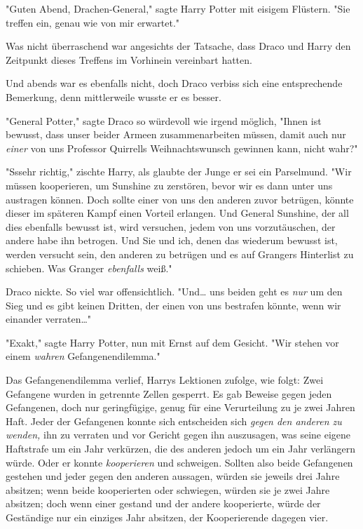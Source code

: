 {"Guten Abend, Drachen-General," sagte Harry Potter mit eisigem Flüstern. "Sie treffen ein, genau wie von mir erwartet."

Was nicht überraschend war angesichts der Tatsache, dass Draco und Harry den Zeitpunkt dieses Treffens im Vorhinein vereinbart hatten.

Und abends war es ebenfalls nicht, doch Draco verbiss sich eine entsprechende Bemerkung, denn mittlerweile wusste er es besser.

"General Potter," sagte Draco so würdevoll wie irgend möglich, "Ihnen ist bewusst, dass unser beider Armeen zusammenarbeiten müssen, damit auch nur \emph{einer} von uns Professor Quirrells Weihnachtswunsch gewinnen kann, nicht wahr?"

"Sssehr richtig," zischte Harry, als glaubte der Junge er sei ein Parselmund. "Wir müssen kooperieren, um Sunshine zu zerstören, bevor wir es dann unter uns austragen können. Doch sollte einer von uns den anderen zuvor betrügen, könnte dieser im späteren Kampf einen Vorteil erlangen. Und General Sunshine, der all dies ebenfalls bewusst ist, wird versuchen, jedem von uns vorzutäuschen, der andere habe ihn betrogen. Und Sie und ich, denen das wiederum bewusst ist, werden versucht sein, den anderen zu betrügen und es auf Grangers Hinterlist zu schieben. Was Granger \emph{ebenfalls} weiß."

Draco nickte. So viel war offensichtlich. "Und… uns beiden geht es \emph{nur} um den Sieg und es gibt keinen Dritten, der einen von uns bestrafen könnte, wenn wir einander verraten…"

"Exakt," sagte Harry Potter, nun mit Ernst auf dem Gesicht. "Wir stehen vor einem \emph{wahren} Gefangenendilemma."

Das Gefangenendilemma verlief, Harrys Lektionen zufolge, wie folgt: Zwei Gefangene wurden in getrennte Zellen gesperrt. Es gab Beweise gegen jeden Gefangenen, doch nur geringfügige, genug für eine Verurteilung zu je zwei Jahren Haft. Jeder der Gefangenen konnte sich entscheiden sich \emph{gegen den anderen zu wenden,} ihn zu verraten und vor Gericht gegen ihn auszusagen, was seine eigene Haftstrafe um ein Jahr verkürzen, die des anderen jedoch um ein Jahr verlängern würde. Oder er konnte \emph{kooperieren} und schweigen. Sollten also beide Gefangenen gestehen und jeder gegen den anderen aussagen, würden sie jeweils drei Jahre absitzen; wenn beide kooperierten oder schwiegen, würden sie je zwei Jahre absitzen; doch wenn einer gestand und der andere kooperierte, würde der Geständige nur ein einziges Jahr absitzen, der Kooperierende dagegen vier.

}
